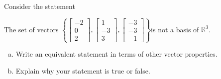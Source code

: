 
\begin{exerciseStatement}


Consider the statement 
\begin{center}\begin{minipage}{0.8\textwidth}
 The set of vectors \( \left\{ \left[\begin{array}{c}
-2 \\
0 \\
2
\end{array}\right] , \left[\begin{array}{c}
1 \\
-3 \\
3
\end{array}\right] , \left[\begin{array}{c}
-3 \\
-3 \\
-1
\end{array}\right] \right\} \)is not a basis of \(\mathbb{R}^3\). 
\end{minipage}\end{center}
    


\begin{enumerate}[(a)]
\item  Write an equivalent statement in terms of other vector properties.
\item  Explain why your statement is true or false.
\end{enumerate}
    
\end{exerciseStatement}
    
